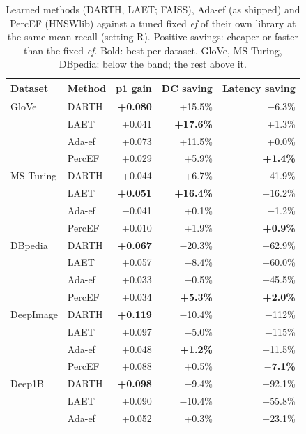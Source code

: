 \documentclass[sigconf,review=false,screen]{acmart}
\newcommand{\ef}{\textit{ef}}
\begin{document}
\begin{table}[t]
  \caption{Learned methods (DARTH, LAET; FAISS), Ada-ef (as shipped) and PercEF (HNSWlib) against a
  tuned fixed \ef{} of their own library at the same mean recall (setting R). Positive savings:
  cheaper or faster than the fixed \ef{}. Bold: best per dataset. GloVe, MS Turing, DBpedia: below
  the band; the rest above it.}
  \label{tab:darth}
  \centering\footnotesize
  \begin{tabular}{llrrr}
    \toprule
    Dataset & Method & p1 gain & DC saving & Latency saving \\
    \midrule
    GloVe         & DARTH  & \textbf{+0.080} & +15.5\% & $-$6.3\% \\
                  & LAET   & +0.041 & \textbf{+17.6\%} & +1.3\% \\
                  & Ada-ef & +0.073 & +11.5\% & +0.0\% \\
                  & PercEF & +0.029 & +5.9\% & \textbf{+1.4\%} \\
    \midrule
    MS Turing     & DARTH  & +0.044 & +6.7\% & $-$41.9\% \\
                  & LAET   & \textbf{+0.051} & \textbf{+16.4\%} & $-$16.2\% \\
                  & Ada-ef & $-$0.041 & +0.1\% & $-$1.2\% \\
                  & PercEF & +0.010 & +1.9\% & \textbf{+0.9\%} \\
    \midrule
    DBpedia       & DARTH  & \textbf{+0.067} & $-$20.3\% & $-$62.9\% \\
                  & LAET   & +0.057 & $-$8.4\% & $-$60.0\% \\
                  & Ada-ef & +0.033 & $-$0.5\% & $-$45.5\% \\
                  & PercEF & +0.034 & \textbf{+5.3\%} & \textbf{+2.0\%} \\
    \midrule
    DeepImage     & DARTH  & \textbf{+0.119} & $-$10.4\% & $-$112\% \\
                  & LAET   & +0.097 & $-$5.0\% & $-$115\% \\
                  & Ada-ef & +0.048 & \textbf{+1.2\%} & $-$11.5\% \\
                  & PercEF & +0.088 & +0.5\% & \textbf{$-$7.1\%} \\
    \midrule
    Deep1B        & DARTH  & \textbf{+0.098} & $-$9.4\% & $-$92.1\% \\
                  & LAET   & +0.090 & $-$10.4\% & $-$55.8\% \\
                  & Ada-ef & +0.052 & +0.3\% & $-$23.1\% \\

\end{tabular}
\end{table}
\end{document}
